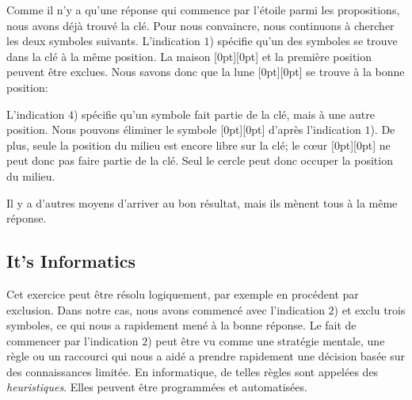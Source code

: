 \documentclass[a4paper,11pt]{report}
\newcommand{\taskGraphicsFolder}{..}
\begin{document}
{\centering%
\par}

Comme il n’y a qu’une réponse qui commence par l’étoile parmi les propositions, nous avons déjà trouvé la clé.
Pour nous convaincre, nous continuons à chercher les deux symboles suivants. L’indication $1$) spécifie qu’un des symboles se trouve dans la clé à la même position. La maison \raisebox{-0.5ex}[0pt][0pt]{} et la première position peuvent être exclues. Nous savons donc que la lune \raisebox{-0.5ex}[0pt][0pt]{} se trouve à la bonne position:

{\centering%
\par}

L’indication $4$) spécifie qu’un symbole fait partie de la clé, mais à une autre position. Nous pouvons éliminer le symbole \raisebox{-0.5ex}[0pt][0pt]{} d’après l’indication $1$). De plus, seule la position du milieu est encore libre sur la clé; le cœur \raisebox{-0.5ex}[0pt][0pt]{} ne peut donc pas faire partie de la clé. Seul le cercle peut donc occuper la position du milieu.

{\centering%
\par}

Il y a d’autres moyens d’arriver au bon résultat, mais ils mènent tous à la même réponse.


\subsection*{It’s Informatics}

Cet exercice peut être résolu logiquement, par exemple en procédent par exclusion. Dans notre cas, nous avons commencé avec l’indication $2$) et exclu trois symboles, ce qui nous a rapidement mené à la bonne réponse. Le fait de commencer par l’indication $2$) peut être vu comme une stratégie mentale, une règle ou un raccourci qui nous a aidé a prendre rapidement une décision basée sur des connaissances limitée. En informatique, de telles règles sont appelées des \emph{heuristiques}. Elles peuvent être programmées et automatisées.
\end{document}
